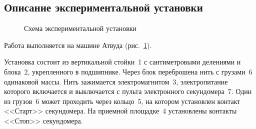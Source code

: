 \documentclass[a4paper, 12pt]{extarticle}
\begin{document}
\subsection{Описание экспериментальной установки}
\begin{figure}[h] %
\caption{Схема экспериментальной установки \label{fig:m2-atwood-machine}}
\end{figure}
Работа выполняется на машине Атвуда (рис.~\ref{fig:m2-atwood-machine}). 

Установка состоит из вертикальной стойки~1 с сантиметровыми делениями и блока~2, укрепленного в подшипнике. Через блок переброшена нить с грузами~6 одинаковой массы. Нить зажимается электромагнитом~3, электропитание которого включается и выключается с пульта электронного секундомера~7. Один из грузов~6 может проходить через кольцо~5, на котором установлен контакт <<Старт>> секундомера. На приемной площадке~4 установлены контакты <<Стоп>> секундомера. 
\end{document}
